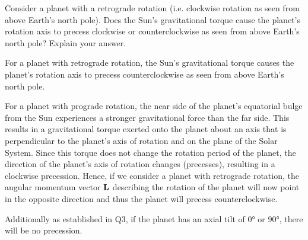 \documentclass[main.tex]{subfiles}
\begin{document}
\begin{q}{4}
Consider a planet with a retrograde rotation (i.e. clockwise rotation as seen
from above Earth's north pole). Does the Sun's gravitational torque cause the
planet's rotation axis to precess clockwise or counterclockwise as seen from
above Earth's north pole? Explain your answer.    
\end{q}

\begin{sol}
For a planet with retrograde rotation, the Sun's gravitational torque causes the
planet's rotation axis to precess counterclockwise as seen from above Earth's
north pole.

\par\medskip

\noindent For a planet with prograde rotation, the near side of the planet's
equatorial bulge from the Sun experiences a stronger gravitational force than
the far side. This results in a gravitational torque exerted onto the planet
about an axis that is perpendicular to the planet's axis of rotation and on the
plane of the Solar System. Since this torque does not change the rotation period
of the planet, the direction of the planet's axis of rotation changes
(precesses), resulting in a clockwise precession. Hence, if we consider a planet
with retrograde rotation, the angular momentum vector $\vb{L}$ describing the
rotation of the planet will now point in the opposite direction and thus the
planet will precess counterclockwise.

\par\medskip

\noindent Additionally as established in Q3, if the planet has an axial tilt of \ang{0} or
\ang{90}, there will be no precession.
\end{sol}
\end{document}

